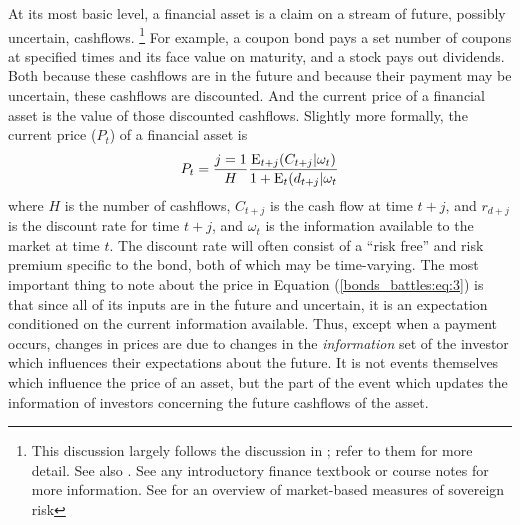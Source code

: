 At its most basic level, a financial asset is a claim on a stream of future, possibly uncertain, cashflows.%
\footnote{
  This discussion largely follows the discussion in \textcite[673]{GuidolinLaFerrara2010}; refer to them for more detail.
  See also \textcite{HaberMitchenerOosterlinckEtAl2015}.
  See any introductory finance textbook or course notes for more information.
  See \textcite{Chan-Lau2006} for an overview of market-based measures of sovereign risk
}
For example, a coupon bond pays a set number of coupons at specified times and its face value on maturity, and a stock pays out dividends.
Both because these cashflows are in the future and because their payment may be uncertain, these cashflows are discounted.
And the current price of a financial asset is the value of those discounted cashflows.
Slightly more formally, the current price ($P_{t}$) of a financial asset is
\begin{equation}
  \label{bonds_battles:eq:3}
  P_{t} = \frac{j = 1}{H} \frac{\operatorname{E}_{t + j}(C_{t + j} | \omega_{t})}{1 + \operatorname{E}_{t}(d_{t+j} | \omega_{t}}
\end{equation}
where $H$ is the number of cashflows, $C_{t + j}$ is the cash flow at time $t + j$, and $r_{d + j}$ is the discount rate for time $t + j$, and $\omega_{t}$ is the information available to the market at time $t$.
The discount rate will often consist of a ``risk free'' and risk premium specific to the bond, both of which may be time-varying.
The most important thing to note about the price in Equation (\ref{bonds_battles:eq:3}) is that since all of its inputs are in the future and uncertain, it is an expectation conditioned on the current information available.
Thus, except when a payment occurs, changes in prices are due to changes in the \textit{information} set of the investor which influences their expectations about the future.
It is not events themselves which influence the price of an asset, but the part of the event which updates the information of investors concerning the future cashflows of the asset.

